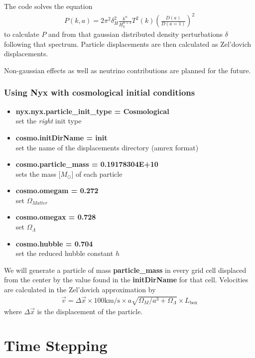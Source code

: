 	The code solves the equation
	\begin{align}
	P(k,a) = 2\pi^2\delta^2_H \frac{k^n}{H_0^{n+3}}T^2(k)\left( \frac{D(a)}{D(a=1)} \right)^2
	\end{align}
	to calculate $P$ and from that gaussian distributed density perturbations
	$\delta$ following that spectrum. Particle displacements are then calculated
	as Zel'dovich displacements.
	
	Non-gaussian effects as well as neutrino contributions are planned for the
	future.
	
\subsubsection{Using Nyx with cosmological initial conditions}
	\begin{itemize}
		\item {\bf nyx.nyx.particle\_init\_type = Cosmological} \\ 
			set the \emph{right} init type
		\item {\bf cosmo.initDirName = init} \\
			set the name of the displacements directory (amrex format)
		\item {\bf cosmo.particle\_mass = 0.19178304E+10} \\
			sets the mass [$M_\odot$] of each particle
		\item {\bf cosmo.omegam = 0.272} \\
			set $\Omega_{Matter}$
		\item {\bf cosmo.omegax = 0.728} \\
			set $\Omega_\Lambda$
		\item {\bf cosmo.hubble = 0.704} \\
			set the reduced hubble constant $h$
	\end{itemize}
	
	We will generate a particle of mass \textbf{particle\_mass} in every grid cell
	displaced from the center by the value found in the \textbf{initDirName} for
	that cell. Velocities are calculated in the Zel'dovich approximation by
	\begin{align}
		\vec{v} = \Delta{\vec{x}} \times 100 \text{km/s} \times a \sqrt{\Omega_M/a^3+\Omega_\Lambda} \times L_{\text{box}}
	\end{align}
	where $\Delta{\vec{x}}$ is the displacement of the particle.
	
\section{Time Stepping}

